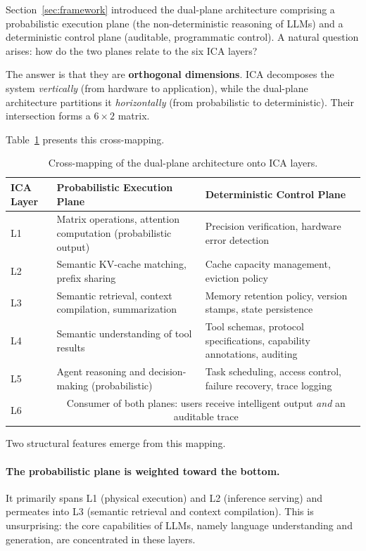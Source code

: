 Section~\ref{sec:framework} introduced the dual-plane architecture comprising a probabilistic execution plane (the non-deterministic reasoning of LLMs) and a deterministic control plane (auditable, programmatic control). A natural question arises: how do the two planes relate to the six ICA layers?

The answer is that they are \textbf{orthogonal dimensions}. ICA decomposes the system \textit{vertically} (from hardware to application), while the dual-plane architecture partitions it \textit{horizontally} (from probabilistic to deterministic). Their intersection forms a $6 \times 2$ matrix.

Table~\ref{tab:dual-plane-icam} presents this cross-mapping.

\begin{table}[h]
\centering
\footnotesize
\caption{Cross-mapping of the dual-plane architecture onto ICA layers.}
\label{tab:dual-plane-icam}
\begin{tabularx}{\textwidth}{p{}p{}p{}}
\toprule
ICA Layer & Probabilistic Execution Plane & Deterministic Control Plane \\
\midrule
L1 & Matrix operations, attention computation (probabilistic output) & Precision verification, hardware error detection \\
L2 & Semantic KV-cache matching, prefix sharing & Cache capacity management, eviction policy \\
L3 & Semantic retrieval, context compilation, summarization & Memory retention policy, version stamps, state persistence \\
L4 & Semantic understanding of tool results & Tool schemas, protocol specifications, capability annotations, auditing \\
L5 & Agent reasoning and decision-making (probabilistic) & Task scheduling, access control, failure recovery, trace logging \\
L6 & \multicolumn{2}{c}{Consumer of both planes: users receive intelligent output \textit{and} an auditable trace} \\
\bottomrule
\end{tabularx}
\end{table}

Two structural features emerge from this mapping.

\paragraph{The probabilistic plane is weighted toward the bottom.}
It primarily spans L1 (physical execution) and L2 (inference serving) and permeates into L3 (semantic retrieval and context compilation). This is unsurprising: the core capabilities of LLMs, namely language understanding and generation, are concentrated in these layers.


